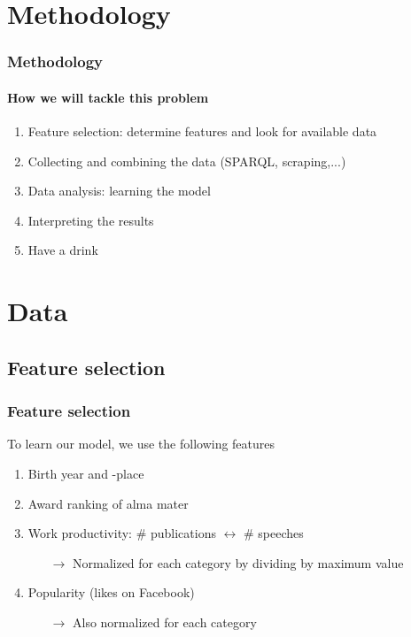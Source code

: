 \documentclass[nonav,sleutel]{beamer}
\begin{document}
\section{Methodology}
\begin{frame}
\frametitle{Methodology}
\framesubtitle{How we will tackle this problem}
\begin{enumerate}
\item<1-> Feature selection: determine features and look for available data
\item<2-> Collecting and combining the data (SPARQL, scraping,...)
\item<3-> Data analysis: learning the model
\item<4-> Interpreting the results
\item<5-> Have a drink
\end{enumerate}
\end{frame}

\section{Data}

\subsection{Feature selection}
\begin{frame}
\frametitle{Feature selection}
To learn our model, we use the following features\\[.5cm]
\begin{enumerate}
\item<1-> Birth year and -place
\item<2-> Award ranking of alma mater
\item<3-> Work productivity: \# publications $\leftrightarrow$ \# speeches
	\begin{itemize}
		\item[$\rightarrow$] Normalized for each category by dividing by maximum value 
	\end{itemize}
\item<4-> Popularity (likes on Facebook)
	\begin{itemize}
		\item[$\rightarrow$] Also normalized for each category
	\end{itemize}
\setcounter{featureCounter}{\theenumi}
\end{enumerate}
\vspace{.5cm}
\end{frame}
\end{document}
